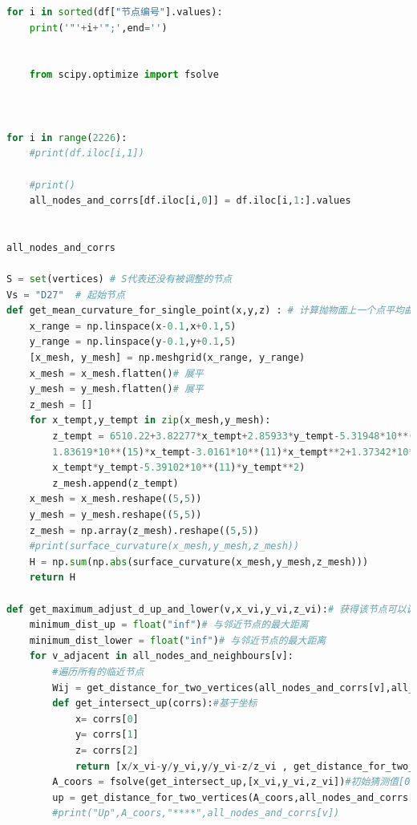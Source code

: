 \documentclass[withoutpreface,bwprint]{cumcmthesis} %
\begin{document}
\begin{appendices}
\begin{lstlisting}[language=python]
    for i in sorted(df["节点编号"].values):
    print('"'+i+'";',end='')


    from scipy.optimize import fsolve



for i in range(2226):
    #print(df.iloc[i,1])

    #print()
    all_nodes_and_corrs[df.iloc[i,0]] = df.iloc[i,1:].values

    
all_nodes_and_corrs    

S = set(vertices) # S代表还没有被调整的节点
Vs = "D27"  # 起始节点
def get_mean_curvature_for_single_point(x,y,z) : # 计算抛物面上一个点平均曲率
    x_range = np.linspace(x-0.1,x+0.1,5)
    y_range = np.linspace(y-0.1,y+0.1,5)
    [x_mesh, y_mesh] = np.meshgrid(x_range, y_range)
    x_mesh = x_mesh.flatten()# 展平
    y_mesh = y_mesh.flatten()# 展平
    z_mesh = [] 
    for x_tempt,y_tempt in zip(x_mesh,y_mesh):
        z_tempt = 6510.22+3.82277*x_tempt+2.85933*y_tempt-5.31948*10**(-6)*np.sqrt(1.63902*10**(18)+
        1.83619*10**(15)*x_tempt-3.0161*10**(11)*x_tempt**2+1.37342*10**(15)*y_tempt+8.06466*10**(11)*
        x_tempt*y_tempt-5.39102*10**(11)*y_tempt**2)
        z_mesh.append(z_tempt)
    x_mesh = x_mesh.reshape((5,5))
    y_mesh = y_mesh.reshape((5,5))
    z_mesh = np.array(z_mesh).reshape((5,5))
    #print(surface_curvature(x_mesh,y_mesh,z_mesh))
    H = np.sum(np.abs(surface_curvature(x_mesh,y_mesh,z_mesh)))
    return H

def get_maximum_adjust_d_up_and_lower(v,x_vi,y_vi,z_vi):# 获得该节点可以调节的最大上距离和下距离
    minimum_dist_up = float("inf")# 与邻近节点的最大距离
    minimum_dist_lower = float("inf")# 与邻近节点的最大距离
    for v_adjacent in all_nodes_and_neighbours[v]:
        #遍历所有的临近节点
        Wij = get_distance_for_two_vertices(all_nodes_and_corrs[v],all_nodes_and_corrs[v_adjacent])
        def get_intersect_up(corrs):#基于坐标
            x= corrs[0]
            y= corrs[1]
            z= corrs[2]
            return [x/x_vi-y/y_vi,y/y_vi-z/z_vi , get_distance_for_two_vertices([x,y,z],all_nodes_and_corrs[v_adjacent])-Wij*(1-0.0007)]
        A_coors = fsolve(get_intersect_up,[x_vi,y_vi,z_vi])#初始猜测值[0,-1]
        up = get_distance_for_two_vertices(A_coors,all_nodes_and_corrs[v])
        #print("Up",A_coors,"****",all_nodes_and_corrs[v])
        

\end{lstlisting}
\end{appendices}
\end{document}
